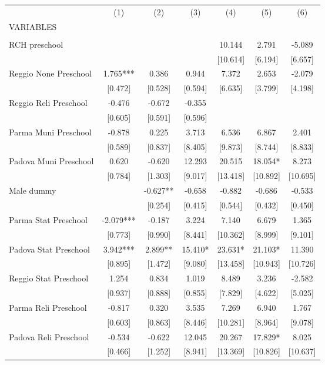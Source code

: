 \begin{tabular}{lcccccc} \hline
 & (1) & (2) & (3) & (4) & (5) & (6) \\
VARIABLES &  &  &  &  &  &  \\ \hline
 &  &  &  &  &  &  \\
RCH preschool &  &  &  & 10.144 & 2.791 & -5.089 \\
 &  &  &  & [10.614] & [6.194] & [6.657] \\
Reggio None Preschool & 1.765*** & 0.386 & 0.944 & 7.372 & 2.653 & -2.079 \\
 & [0.472] & [0.528] & [0.594] & [6.635] & [3.799] & [4.198] \\
Reggio Reli Preschool & -0.476 & -0.672 & -0.355 &  &  &  \\
 & [0.605] & [0.591] & [0.596] &  &  &  \\
Parma Muni Preschool & -0.878 & 0.225 & 3.713 & 6.536 & 6.867 & 2.401 \\
 & [0.589] & [0.837] & [8.405] & [9.873] & [8.744] & [8.833] \\
Padova Muni Preschool & 0.620 & -0.620 & 12.293 & 20.515 & 18.054* & 8.273 \\
 & [0.784] & [1.303] & [9.017] & [13.418] & [10.892] & [10.695] \\
Male dummy &  & -0.627** & -0.658 & -0.882 & -0.686 & -0.533 \\
 &  & [0.254] & [0.415] & [0.544] & [0.432] & [0.450] \\
Parma Stat Preschool & -2.079*** & -0.187 & 3.224 & 7.140 & 6.679 & 1.365 \\
 & [0.773] & [0.990] & [8.441] & [10.362] & [8.999] & [9.101] \\
Padova Stat Preschool & 3.942*** & 2.899** & 15.410* & 23.631* & 21.103* & 11.390 \\
 & [0.895] & [1.472] & [9.080] & [13.458] & [10.943] & [10.726] \\
Reggio Stat Preschool & 1.254 & 0.834 & 1.019 & 8.489 & 3.236 & -2.582 \\
 & [0.937] & [0.888] & [0.855] & [7.829] & [4.622] & [5.025] \\
Parma Reli Preschool & -0.817 & 0.320 & 3.535 & 7.269 & 6.940 & 1.767 \\
 & [0.603] & [0.863] & [8.446] & [10.281] & [8.964] & [9.078] \\
Padova Reli Preschool & -0.534 & -0.622 & 12.045 & 20.267 & 17.829* & 8.025 \\
 & [0.466] & [1.252] & [8.941] & [13.369] & [10.826] & [10.637] \\

\end{tabular}
